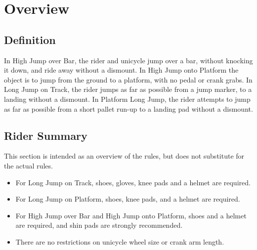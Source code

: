 \chapter{Overview}

\section{Definition}

In High Jump over Bar, the rider and unicycle jump over a bar, without knocking it down, and ride away without a dismount.
In High Jump onto Platform the object is to jump from the ground to a platform, with no pedal or crank grabs.
In Long Jump on Track, the rider jumps as far as possible from a jump marker, to a landing without a dismount.
In Platform Long Jump, the rider attempts to jump as far as possible from a short pallet run-up to a landing pad without a dismount.

\section{Rider Summary}

This section is intended as an overview of the rules, but does not substitute for the actual rules.
\begin{itemize}
  \item For Long Jump on Track, shoes, gloves, knee pads and a helmet are required.
  \item For Long Jump on Platform, shoes, knee pads, and a helmet are required.
  \item For High Jump over Bar and High Jump onto Platform, shoes and a helmet are required, and shin pads are strongly recommended.
  \item There are no restrictions on unicycle wheel size or crank arm length.
\end{itemize}
